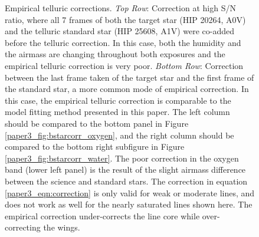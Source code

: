 \begin{figure}[t]
\begin{center}
\caption{Empirical telluric corrections. \emph{Top Row}: Correction at high S/N ratio, where all 7 frames of both the target star (HIP 20264, A0V) and the telluric standard star (HIP 25608, A1V) were co-added before the telluric correction. In this case, both the humidity and the airmass are changing throughout both exposures and the empirical telluric correction is very poor. \emph{Bottom Row}: Correction between the last frame taken of the target star and the first frame of the standard star, a more common mode of empirical correction. In this case, the empirical telluric correction is comparable to the model fitting method presented in this paper. The left column should be compared to the bottom panel in Figure \ref{paper3_fig:bstarcorr_oxygen}, and the right column should be compared to the bottom right subfigure in Figure \ref{paper3_fig:bstarcorr_water}. The poor correction in the oxygen band (lower left panel) is the result of the slight airmass difference between the science and standard stars. The correction in equation \ref{paper3_eqn:correction} is only valid for weak or moderate lines, and does not work as well for the nearly saturated lines shown here. The empirical correction under-corrects the line core while over-correcting the wings.}

\label{paper3_fig:bstarcorr_empirical}
\end{center}
\end{figure}




